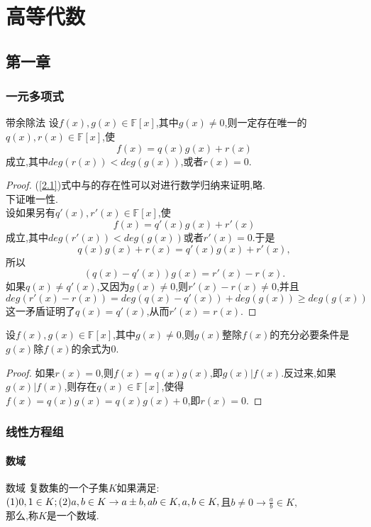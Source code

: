 \documentclass[lang=cn,11pt,normal]{elegantbook}
\begin{document}
	\chapter{高等代数}
	\section{第一章}
	\subsection{一元多项式}
	\begin{definition}{带余除法}{}
		设$f(x),g(x)\in \mathbb{F}[x]$,其中$g(x)\ne0$,则一定存在唯一的$q(x),r(x)\in\mathbb{F}[x]$,使
		\begin{equation}
		f(x)=q(x)g(x)+r(x)\label{2.1}
		\end{equation}
		成立,其中$deg(r(x))<deg(g(x))$,或者$r(x)=0$.
	\end{definition}
	\begin{proof}
		(\ref{2.1})式中与的存在性可以对进行数学归纳来证明,略.\\
		下证唯一性.\\
		设如果另有$q'(x),r'(x)\in\mathbb{F}[x]$,使
		\begin{equation}
		f(x)=q'(x)g(x)+r'(x)
		\end{equation}
		成立,其中$deg(r'(x))<deg(g(x))$或者$r'(x)=0$.于是
		\begin{equation}
			q(x)g(x)+r(x)=q'(x)g(x)+r'(x),
		\end{equation}
		所以
		\begin{equation}
			(q(x)-q'(x))g(x)=r'(x)-r(x).
		\end{equation}
		如果$q(x)\ne q'(x)$,又因为$g(x)\ne0$,则$r'(x)-r(x)\ne 0$,并且
		\begin{equation}
			deg(r'(x)-r(x))=deg(q(x)-q'(x))+deg(g(x))\geqslant deg(g(x))
		\end{equation}
		这一矛盾证明了$q(x)=q'(x)$,从而$r'(x)=r(x)$.
	\end{proof}
	\begin{theorem}{ }{ }
		 设$f(x),g(x)\in \mathbb{F}[x]$,其中$g(x)\ne 0$,则$g(x)$整除$f(x)$的充分必要条件是$g(x)$除$f(x)$的余式为0.
	\end{theorem}
	\begin{proof}
		如果$r(x)=0$,则$f(x)=q(x)g(x)$,即$g(x)|f(x)$.反过来,如果$g(x)|f(x)$,则存在$q(x)\in\mathbb{F}[x]$,使得$f(x)=q(x)g(x)=q(x)g(x)+0$,即$r(x)=0$.
	\end{proof}
	\subsection{线性方程组}
	\subsubsection{数域}
	\begin{definition}{数域}{}
		复数集的一个子集$K$如果满足:\\
			$
			(1)0,1\in K;\\
			(2)a,b\in K\rightarrow a\pm b,ab\in K,\\
			a,b\in K,$且$b\ne 0\rightarrow \frac{a}{b}\in K,
			$\\
			那么,称$K$是一个数域.
	\end{definition}
\end{document}
